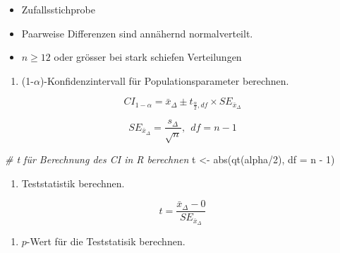 \documentclass[
]{book}
\newenvironment{Shaded}{\begin{snugshade}}{\end{snugshade}}
\newcommand{\AttributeTok}[1]{\textcolor[rgb]{0.77,0.63,0.00}{#1}}
\newcommand{\CommentTok}[1]{\textcolor[rgb]{0.56,0.35,0.01}{\textit{#1}}}
\newcommand{\DecValTok}[1]{\textcolor[rgb]{0.00,0.00,0.81}{#1}}
\newcommand{\FunctionTok}[1]{\textcolor[rgb]{0.00,0.00,0.00}{#1}}
\newcommand{\NormalTok}[1]{#1}
\newcommand{\OtherTok}[1]{\textcolor[rgb]{0.56,0.35,0.01}{#1}}
\newcommand{\SpecialCharTok}[1]{\textcolor[rgb]{0.00,0.00,0.00}{#1}}
\providecommand{\tightlist}{%
  \setlength{\itemsep}{0pt}\setlength{\parskip}{0pt}}
\begin{document}
\begin{itemize}
\tightlist
\item
  Zufallsstichprobe\\
\item
  Paarweise Differenzen sind annähernd normalverteilt.\\
\item
  \(n \geq 12\) oder grösser bei stark schiefen Verteilungen
\end{itemize}

\begin{enumerate}
\def\labelenumi{\arabic{enumi}.}
\setcounter{enumi}{3}
\tightlist
\item
  (1-\(\alpha\))-Konfidenzintervall für Populationsparameter berechnen.
\end{enumerate}

\begin{equation}
  CI_{1-\alpha} = \bar{x}_{\Delta} \pm t_{\frac{\alpha}{2}, df} \times SE_{\bar{x}_{\Delta}}
  \label{eq:CI-tpaired}
\end{equation}

\begin{equation}
  SE_{\bar{x}_{\Delta}} = \frac{s_{\Delta}}{\sqrt{n}}, ~~ df = n-1
  \label{eq:se-tpaired}
\end{equation}

\begin{Shaded}
\begin{Highlighting}[]
\CommentTok{\# t für Berechnung des CI in R berechnen}
\NormalTok{t }\OtherTok{\textless{}{-}} \FunctionTok{abs}\NormalTok{(}\FunctionTok{qt}\NormalTok{(alpha}\SpecialCharTok{/}\DecValTok{2}\NormalTok{), }\AttributeTok{df =}\NormalTok{ n }\SpecialCharTok{{-}} \DecValTok{1}\NormalTok{)}
\end{Highlighting}
\end{Shaded}

\begin{enumerate}
\def\labelenumi{\arabic{enumi}.}
\setcounter{enumi}{4}
\tightlist
\item
  Teststatistik berechnen.
\end{enumerate}

\begin{equation}
  t = \frac{\bar{x}_{\Delta} - 0}{SE_{\bar{x}_{\Delta}}}
  \label{eq:t-paired}
\end{equation}

\begin{enumerate}
\def\labelenumi{\arabic{enumi}.}
\setcounter{enumi}{5}
\tightlist
\item
  \(p\)-Wert für die Teststatisik berechnen.
\end{enumerate}
\end{document}
